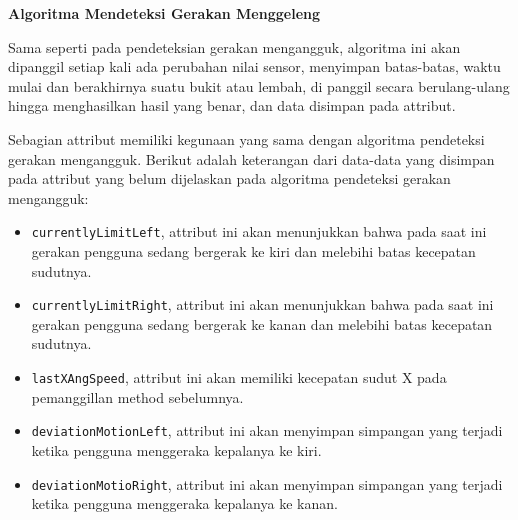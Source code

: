 \documentclass[a4paper,twoside]{article}
\begin{document}
\begin{enumerate}
\textbf{Algoritma Mendeteksi Gerakan Menggeleng}
\label{ssec:algoritme_mendeteksi_gerakan_menggeleng}

Sama seperti pada pendeteksian gerakan mengangguk, algoritma ini akan dipanggil setiap kali ada perubahan nilai sensor, menyimpan batas-batas, waktu mulai dan berakhirnya suatu bukit atau lembah, di panggil secara berulang-ulang hingga menghasilkan hasil yang benar, dan data disimpan pada attribut.

Sebagian attribut memiliki kegunaan yang sama dengan algoritma pendeteksi gerakan mengangguk. Berikut adalah keterangan dari data-data yang disimpan pada attribut yang belum dijelaskan pada algoritma pendeteksi gerakan mengangguk:
\begin{itemize}
	\item \texttt{currentlyLimitLeft}, attribut ini akan menunjukkan bahwa pada saat ini gerakan pengguna sedang bergerak ke kiri dan melebihi batas kecepatan sudutnya.
	\item \texttt{currentlyLimitRight}, attribut ini akan menunjukkan bahwa pada saat ini gerakan pengguna sedang bergerak ke kanan dan melebihi batas kecepatan sudutnya.
	\item \texttt{lastXAngSpeed}, attribut ini akan memiliki kecepatan sudut X pada pemanggillan method sebelumnya. 
	\item \texttt{deviationMotionLeft}, attribut ini akan menyimpan simpangan yang terjadi ketika pengguna menggeraka kepalanya ke kiri. 
	\item \texttt{deviationMotioRight}, attribut ini akan menyimpan simpangan yang terjadi ketika pengguna menggeraka kepalanya ke kanan. 
\end{itemize}



\end{enumerate}
\end{document}
